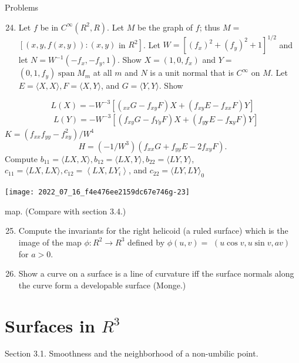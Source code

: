 \documentclass[10pt]{article}
\begin{document}
Problems

\begin{enumerate}
  \setcounter{enumi}{23}
  \item Let $f$ be in $C^{\infty}\left(R^{2}, R\right)$. Let $M$ be the graph of $f$; thus $M=$ $\left[(x, y, f(x, y)):(x, y)\right.$ in $\left.R^{2}\right]$. Let $W=\left[\left(f_{x}\right)^{2}+\left(f_{y}\right)^{2}+1\right]^{1 / 2}$ and let $N=W^{-1}\left(-f_{x},-f_{y}, 1\right)$. Show $X=\left(1,0, f_{x}\right)$ and $Y=$ $\left(0,1, f_{y}\right) \operatorname{span} M_{m}$ at all $m$ and $N$ is a unit normal that is $C^{\infty}$ on $M .$ Let $E=\langle X, X\rangle, F=\langle X, Y\rangle$, and $G=\langle Y, Y\rangle$. Show
\end{enumerate}
$$
L(X)=-W^{-3}\left[\left(_{x x} G-f_{x y} F\right) X+\left(f_{x y} E-f_{x x} F\right) Y\right]
$$
$$
\begin{aligned}
& L(Y)=-W^{-3}\left[\left(f_{x y} G-f_{Y y} F\right) X+\left(f_{y \boldsymbol{y}} E-f_{\mathbf{x} y} F\right) Y\right]
\end{aligned}
$$
$K=\left(f_{x x} f_{y y}-f_{x y}^{2}\right) / W^{4}$
$$
H=\left(-1 / W^{3}\right)\left(f_{x x} G+f_{y y} E-2 f_{x y} F\right) .
$$
Compute $b_{11}=\langle L X, X\rangle, b_{12}=\langle L X, Y\rangle, b_{22}=\langle L Y, Y\rangle$, $c_{11}=\langle L X, L X\rangle, c_{12}=\left\langle L X, L Y_{i}\right\rangle$, and $c_{22}=\langle L Y, L Y\rangle_{0}$

\texttt{[image: 2022\_07\_16\_f4e476ee2159dc67e746g-23]}

map. (Compare with section 3.4.)

\begin{enumerate}
  \setcounter{enumi}{24}
  \item Compute the invariants for the right helicoid (a ruled surface) which is the image of the map $\phi: R^{2} \rightarrow R^{3}$ defined by $\phi(u, v)=$ $(u \cos v, u \sin v, a v)$ for $a>0$.

  \item Show a curve on a surface is a line of curvature iff the surface normals along the curve form a developable surface (Monge.)

\end{enumerate}
\section{Surfaces in $R^{3}$}


Section 3.1. Smoothness and the neighborhood of a non-umbilic point.
\end{document}
